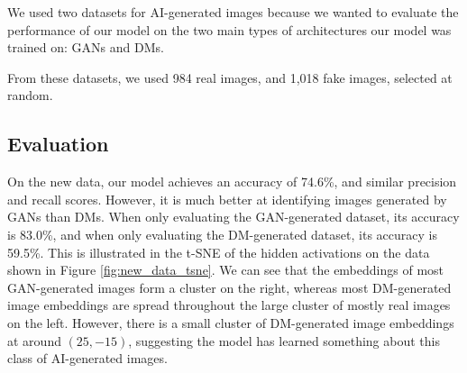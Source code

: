 \documentclass{article} %
\begin{document}
We used two datasets for AI-generated images because we wanted to evaluate the performance of our model on the two main types of architectures our model was trained on: GANs and DMs.

From these datasets, we used 984 real images, and 1,018 fake images, selected at random.

\subsection{Evaluation}

On the new data, our model achieves an accuracy of 74.6\%, and similar precision and recall scores. However, it is much better at identifying images generated by GANs than DMs. When only evaluating the GAN-generated dataset, its accuracy is 83.0\%, and when only evaluating the DM-generated dataset, its accuracy is 59.5\%. This is illustrated in the t-SNE of the hidden activations on the data shown in Figure \ref{fig:new_data_tsne}. We can see that the embeddings of most GAN-generated images form a cluster on the right, whereas most DM-generated image embeddings are spread throughout the large cluster of mostly real images on the left. However, there is a small cluster of DM-generated image embeddings at around $(25, -15)$, suggesting the model has learned something about this class of AI-generated images.
\end{document}
